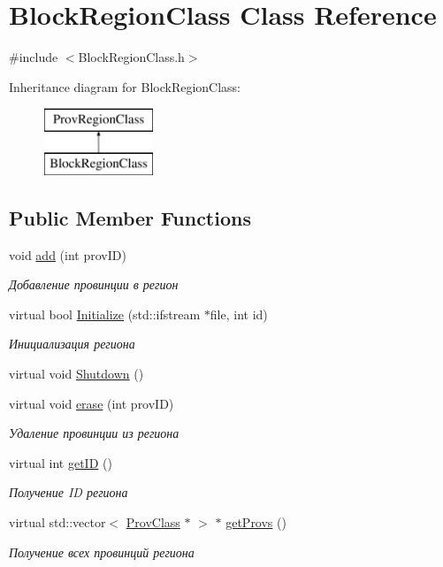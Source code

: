 \hypertarget{class_block_region_class}{}\section{Block\+Region\+Class Class Reference}
\label{class_block_region_class}


{\ttfamily \#include $<$Block\+Region\+Class.\+h$>$}

Inheritance diagram for Block\+Region\+Class\+:\begin{figure}[H]
\begin{center}
\leavevmode
\includegraphics[height=2.000000cm]{class_block_region_class}
\end{center}
\end{figure}
\subsection*{Public Member Functions}
\begin{DoxyCompactItemize}
\item 
void \hyperlink{class_block_region_class_a95052be1d1d550dab72197af99f4d4e1}{add} (int prov\+ID)
\begin{DoxyCompactList}\small\item\em Добавление провинции в регион \end{DoxyCompactList}\item 
virtual bool \hyperlink{class_prov_region_class_a733b3a8580bd1bb038295a5b8ab4f1a0}{Initialize} (std\+::ifstream $\ast$file, int id)
\begin{DoxyCompactList}\small\item\em Инициализация региона \end{DoxyCompactList}\item 
virtual void \hyperlink{class_prov_region_class_adf3f702c865e613515590fb928a5eaf1}{Shutdown} ()
\item 
virtual void \hyperlink{class_prov_region_class_ad28dbe98716517339922d6c4e0433611}{erase} (int prov\+ID)
\begin{DoxyCompactList}\small\item\em Удаление провинции из региона \end{DoxyCompactList}\item 
virtual int \hyperlink{class_prov_region_class_ab6f83c85a913b7f9ac3f6839b3386793}{get\+ID} ()
\begin{DoxyCompactList}\small\item\em Получение ID региона \end{DoxyCompactList}\item 
virtual std\+::vector$<$ \hyperlink{class_prov_class}{Prov\+Class} $\ast$ $>$ $\ast$ \hyperlink{class_prov_region_class_a31c1bdb93bda5a0bd0fc66382d39473e}{get\+Provs} ()
\begin{DoxyCompactList}\small\item\em Получение всех провинций региона \end{DoxyCompactList}\end{DoxyCompactItemize}
